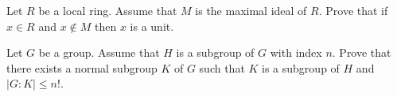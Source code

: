 Let $R$ be a local ring. Assume that $M$ is the maximal ideal of $R$. Prove that if $x \in R$ and $x \notin M$ then $x$ is a unit.


Let $G$ be a group. Assume that $H$ is a subgroup of $G$ with index $n$. Prove that there exists a normal subgroup $K$ of $G$ such that $K$ is a subgroup of $H$ and $|G : K | \le n!$.  